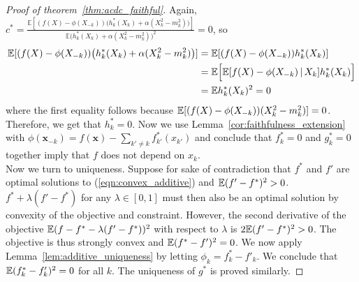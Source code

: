 \begin{proof}[Proof of theorem~\ref{thm:acdc_faithful}]
Again, $c^* = \frac{\mathbb{E}[(f(X)-\phi(X_{-k}))\big( 
           h^*_k(X_k) + \alpha (X_k^2 - m_k^2) \big)]}{\mathbb{E}
       \big( h^*_k(X_k) + \alpha (X_k^2 - m_k^2) \big)^2} = 0$, so
\begin{align*}
\mathbb{E}[ (f(X)-\phi(X_{-k})) \big( h^*_k(X_k) + \alpha (X_k^2-m_k^2) \big) ] &= 
\mathbb{E}[ (f(X) - \phi(X_{-k})) h^*_k(X_k) ] \\
& = \mathbb{E}\Big[ \mathbb{E}[ f(X) - \phi(X_{-k}) {\,|\,} X_k]  h^*_k(X_k) \Big] \\
& = \mathbb{E} h^*_k(X_k)^2 = 0
\end{align*}
where the first equality follows because ${\mathbb E}[ (f(X) - \phi(X_{-k})) (X_k^2 - m_k^2)] = 0$. Therefore, we get that $h^*_k = 0$. Now we use
Lemma~\ref{cor:faithfulness_extension} with $\phi(\mathbf{x}_{-k}) =
f(\mathbf{x}) - \sum_{k' \neq k} f^*_{k'} (x_{k'})$ and conclude that
$f^*_k = 0$ and $g^*_k = 0$ together imply that $f$ does not depend on $x_k$.\\

Now we turn to uniqueness. Suppose for sake of contradiction that $f^*$ and $f'$ are optimal solutions to (\ref{eqn:convex_additive}) and ${\mathbb E} (f'-f^*)^2 > 0$.  $f^* + \lambda ( f' - f^*)$ for any $\lambda \in [0,1]$ must then also be an optimal solution by convexity of the objective and constraint. However, the second derivative of the objective ${\mathbb E}( f - f^* - \lambda(f' - f^*))^2$ with respect to $\lambda$ is $2 {\mathbb E}( f' - f^*)^2 > 0$. The objective is thus strongly convex and ${\mathbb E}(f^* - f')^2 = 0$. We now apply Lemma~\ref{lem:additive_uniqueness} by letting $\phi_k = f^*_k - f'_k$. We conclude that ${\mathbb E} (f^*_k - f'_k)^2 = 0$ for all $k$. The uniqueness of $g^*$ is proved similarly.
\end{proof}






